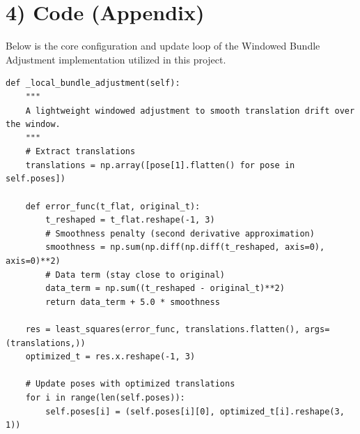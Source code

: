 \documentclass[12pt]{article}
\begin{document}
\section*{4) Code (Appendix)}

Below is the core configuration and update loop of the Windowed Bundle Adjustment implementation utilized in this project.

\begin{verbatim}
def _local_bundle_adjustment(self):
    """
    A lightweight windowed adjustment to smooth translation drift over the window.
    """
    # Extract translations
    translations = np.array([pose[1].flatten() for pose in self.poses])
    
    def error_func(t_flat, original_t):
        t_reshaped = t_flat.reshape(-1, 3)
        # Smoothness penalty (second derivative approximation)
        smoothness = np.sum(np.diff(np.diff(t_reshaped, axis=0), axis=0)**2)
        # Data term (stay close to original)
        data_term = np.sum((t_reshaped - original_t)**2)
        return data_term + 5.0 * smoothness
        
    res = least_squares(error_func, translations.flatten(), args=(translations,))
    optimized_t = res.x.reshape(-1, 3)
    
    # Update poses with optimized translations
    for i in range(len(self.poses)):
        self.poses[i] = (self.poses[i][0], optimized_t[i].reshape(3, 1))
\end{verbatim}
\end{document}
